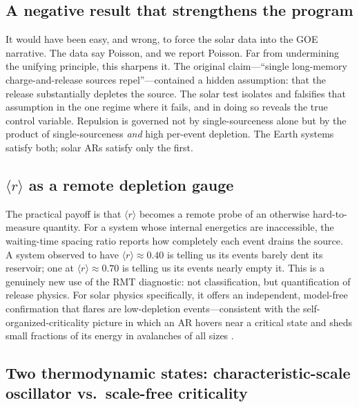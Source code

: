 \documentclass[12pt,a4paper]{article}
\begin{document}
\subsection{A negative result that strengthens the program}

It would have been easy, and wrong, to force the solar data into the GOE narrative. The data say Poisson, and we report Poisson. Far from undermining the unifying principle, this sharpens it. The original claim---``single long-memory charge-and-release sources repel''---contained a hidden assumption: that the release substantially depletes the source. The solar test isolates and falsifies that assumption in the one regime where it fails, and in doing so reveals the true control variable. Repulsion is governed not by single-sourceness alone but by the product of single-sourceness \emph{and} high per-event depletion. The Earth systems satisfy both; solar ARs satisfy only the first.

\subsection{$\langle r\rangle$ as a remote depletion gauge}

The practical payoff is that $\langle r\rangle$ becomes a remote probe of an otherwise hard-to-measure quantity. For a system whose internal energetics are inaccessible, the waiting-time spacing ratio reports how completely each event drains the source. A system observed to have $\langle r\rangle\approx0.40$ is telling us its events barely dent its reservoir; one at $\langle r\rangle\approx0.70$ is telling us its events nearly empty it. This is a genuinely new use of the RMT diagnostic: not classification, but quantification of release physics. For solar physics specifically, it offers an independent, model-free confirmation that flares are low-depletion events---consistent with the self-organized-criticality picture in which an AR hovers near a critical state and sheds small fractions of its energy in avalanches of all sizes \citep{lu1991,aschwanden2011}.

\subsection{Two thermodynamic states: characteristic-scale oscillator vs.\ scale-free criticality}
\end{document}

